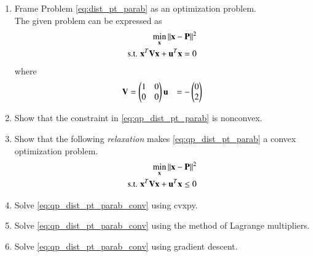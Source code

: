 \begin{enumerate}[label=\arabic*.,ref=\thesection.\theenumi]
%
%
\item Frame 	Problem \ref{eq:dist_pt_parab}
 as an optimization problem.
\label{prob:qp_dist_pt_parab}
\\
\solution The given problem can be expressed as
\begin{align}
\label{eq:qp_dist_pt_parab}
\min_{\mathbf{x}}\left\lVert\mathbf{x}-\mathbf{P}\right\rVert^2
\\
\text{s.t. }\mathbf{x}^T\mathbf{V}\mathbf{x} + \mathbf{u}^T\mathbf{x}  = 0
\end{align}
%
where
%
\begin{align}
\mathbf{V} &= \begin{pmatrix}1 & 0\\0 & 0\end{pmatrix}
\mathbf{u} &= -\begin{pmatrix}0 \\ 2\end{pmatrix}
\end{align}
%
\item Show that the constraint in \ref{eq:qp_dist_pt_parab} is nonconvex.
\item Show that the following {\em relaxation} makes \eqref{eq:qp_dist_pt_parab} a convex optimization problem.
%
\begin{align}
\label{eq:qp_dist_pt_parab_conv}
\min_{\mathbf{x}}\left\lVert\mathbf{x}-\mathbf{P}\right\rVert^2
\\
\text{s.t. }\mathbf{x}^T\mathbf{V}\mathbf{x} + \mathbf{u}^T\mathbf{x}  \le 0
\end{align}
%
\item Solve \eqref{eq:qp_dist_pt_parab_conv} using cvxpy.
\item Solve \eqref{eq:qp_dist_pt_parab_conv} using the method of Lagrange multipliers.
%
%	
\item Solve \eqref{eq:qp_dist_pt_parab_conv} using gradient descent.
%
\end{enumerate}
